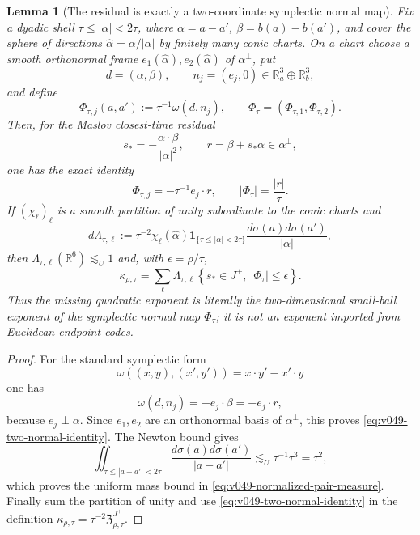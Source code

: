 \documentclass[10pt]{article}
\newtheorem{lemma}[theorem]{Lemma}
\begin{document}
\begin{lemma}[The residual is exactly a two-coordinate symplectic normal map]
\label{lem:v049-two-normal-symplectic-coordinates}
Fix a dyadic shell \(\tau\le|\alpha|<2\tau\), where
\(\alpha=a-a'\), \(\beta=b(a)-b(a')\), and cover the sphere of directions
\(\widehat\alpha=\alpha/|\alpha|\) by finitely many conic charts.  On a chart choose a smooth
orthonormal frame \(e_1(\widehat\alpha),e_2(\widehat\alpha)\) of
\(\alpha^\perp\), put
\[
d=(\alpha,\beta),
\qquad
n_j=(e_j,0)\in\mathbb R_a^3\oplus\mathbb R_b^3,
\]
and define
\begin{equation}
\label{eq:v049-symplectic-normal-map}
\Phi_{\tau,j}(a,a')
:=
\tau^{-1}\omega(d,n_j),
\qquad
\Phi_\tau=(\Phi_{\tau,1},\Phi_{\tau,2}).
\end{equation}
Then, for the Maslov closest-time residual
\[
s_*=-\frac{\alpha\cdot\beta}{{|\alpha|}^2},
\qquad
r=\beta+s_*\alpha\in\alpha^\perp,
\]
one has the exact identity
\begin{equation}
\label{eq:v049-two-normal-identity}
\boxed{
\Phi_{\tau,j}=-\tau^{-1}e_j\cdot r,
\qquad
|\Phi_\tau|=\frac{|r|}{\tau}.
}
\end{equation}
If \((\chi_\ell)_\ell\) is a smooth partition of unity subordinate to the conic charts and
\begin{equation}
\label{eq:v049-normalized-pair-measure}
d\Lambda_{\tau,\ell}
:=
\tau^{-2}\chi_\ell(\widehat\alpha)
\mathbf 1_{\{\tau\le|\alpha|<2\tau\}}
\frac{d\sigma(a)d\sigma(a')}{|\alpha|},
\end{equation}
then \(\Lambda_{\tau,\ell}(\mathbb R^6)\lesssim_U1\) and, with
\(\epsilon=\rho/\tau\),
\begin{equation}
\label{eq:v049-kappa-as-symplectic-small-ball}
\boxed{
\kappa_{\rho,\tau}
=
\sum_\ell
\Lambda_{\tau,\ell}
\left\{
s_*\in J^+,\ |\Phi_\tau|\le\epsilon
\right\}.
}
\end{equation}
Thus the missing quadratic exponent is literally the two-dimensional small-ball exponent of the
symplectic normal map \(\Phi_\tau\); it is not an exponent imported from Euclidean endpoint
codes.
\end{lemma}

\begin{proof}
For the standard symplectic form
\[
\omega((x,y),(x',y'))=x\cdot y'-x'\cdot y
\]
one has
\[
\omega(d,n_j)=-e_j\cdot\beta=-e_j\cdot r,
\]
because \(e_j\perp\alpha\).  Since \(e_1,e_2\) are an orthonormal basis of
\(\alpha^\perp\), this proves \eqref{eq:v049-two-normal-identity}.  The Newton bound gives
\[
\iint_{\tau\le|a-a'|<2\tau}
\frac{d\sigma(a)d\sigma(a')}{|a-a'|}
\lesssim_U
\tau^{-1}\tau^3
=
\tau^2,
\]
which proves the uniform mass bound in \eqref{eq:v049-normalized-pair-measure}.  Finally sum the
partition of unity and use \eqref{eq:v049-two-normal-identity} in the definition
\(\kappa_{\rho,\tau}=\tau^{-2}\mathfrak Z_{\rho,\tau}^{J^+}\).
\end{proof}
\end{document}
